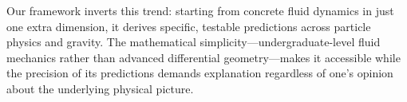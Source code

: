 Our framework inverts this trend: starting from concrete fluid dynamics in just one extra dimension, it derives specific, testable predictions across particle physics and gravity. The mathematical simplicity---undergraduate-level fluid mechanics rather than advanced differential geometry---makes it accessible while the precision of its predictions demands explanation regardless of one's opinion about the underlying physical picture.
